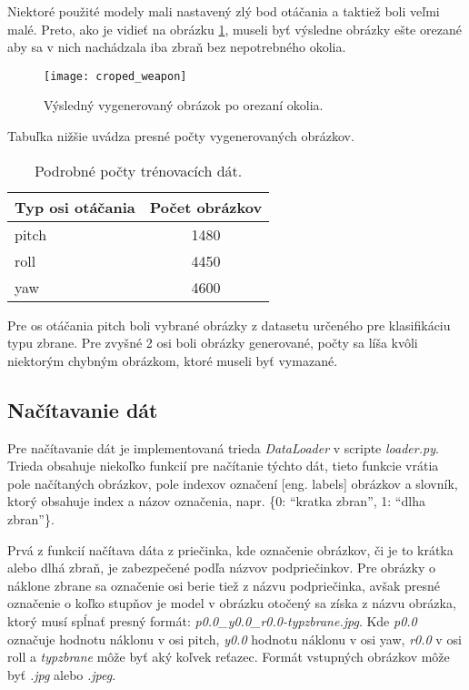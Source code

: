 Niektoré použité modely mali nastavený zlý bod otáčania a taktiež boli veľmi malé.
Preto, ako je vidieť na obrázku \ref{pic:generator3d}, museli byť výsledne obrázky ešte orezané aby sa v nich nachádzala iba zbraň bez nepotrebného okolia.

\begin{figure}[H]
    \centering
    \texttt{[image: croped\_weapon]}
    \caption{Výsledný vygenerovaný obrázok po orezaní okolia.}
    \label{pic:generator3d}
\end{figure}

Tabuľka nižšie uvádza presné počty vygenerovaných obrázkov.

\begin{table}[H]
    \centering
    \label{my-label}
    \begin{tabular}{|l|c|}
        \hline
        Typ osi otáčania & \multicolumn{1}{l|}{Počet obrázkov} \\ \hline
        pitch            & 1480                                \\ \hline
        roll             & 4450                                \\ \hline
        yaw              & 4600                                \\ \hline
        \end{tabular}
    \caption{Podrobné počty trénovacích dát.}
\end{table}

Pre os otáčania pitch boli vybrané obrázky z datasetu určeného pre klasifikáciu typu zbrane.
Pre zvyšné 2 osi boli obrázky generované, počty sa líša kvôli niektorým chybným obrázkom, ktoré museli byť vymazané.

\subsection{Načítavanie dát}
\label{subsec:nacitaniedat}
Pre načítavanie dát je implementovaná trieda \textit{DataLoader} v scripte \textit{loader.py}.
Trieda obsahuje niekoľko funkcií pre načítanie týchto dát, tieto funkcie vrátia pole načítaných obrázkov, pole indexov označení [eng. labels] obrázkov a
    slovník, ktorý obsahuje index a názov označenia, napr. \{0: ``kratka zbran'', 1: ``dlha zbran''\}.

Prvá z funkcií načítava dáta z priečinka, kde označenie obrázkov, či je to krátka alebo dlhá zbraň, je zabezpečené podľa názvov podpriečinkov.
Pre obrázky o náklone zbrane sa označenie osi berie tiež z názvu podpriečinka, avšak presné označenie o koľko stupňov je model v obrázku otočený
    sa získa z názvu obrázka, ktorý musí spĺnať presný formát: \textit{p0.0\_y0.0\_r0.0-typzbrane.jpg}.
Kde \textit{p0.0} označuje hodnotu náklonu v osi pitch, \textit{y0.0} hodnotu náklonu v osi yaw, \textit{r0.0} v osi roll a \textit{typzbrane} môže byť
    aký koľvek reťazec.
Formát vstupných obrázkov môže byť \textit{.jpg} alebo \textit{.jpeg}.

